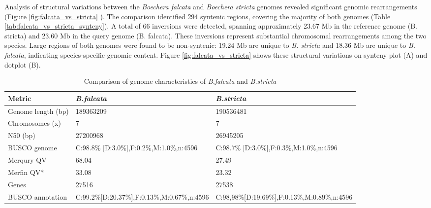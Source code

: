 \documentclass[9pt,twocolumn,twoside,lineno]{gsag3jnl}
\begin{document}
Analysis of structural variations between the \textit{Boechera falcata} and \textit{Boechera stricta} genomes revealed significant genomic rearrangements (Figure \ref{fig:falcata_vs_stricta} ). The comparison identified 294 syntenic regions, covering the majority of both genomes (Table \ref{tab:falcata_vs_stricta_synteny}). A total of 66 inversions were detected, spanning approximately 23.67 Mb in the reference genome (B. stricta) and 23.60 Mb in the query genome (B. falcata). These inversions represent substantial chromosomal rearrangements among the two species. Large regions of both genomes were found to be non-syntenic: 19.24 Mb are unique to \textit{B. stricta} and 18.36 Mb are unique to \textit{B. falcata}, indicating species-specific genomic content. Figure \ref{fig:falcata_vs_stricta} shows these structural variations on synteny plot (A) and dotplot (B).


\begin{table}[p]
\centering
\caption{Comparison of genome characteristics of \textit{B.falcata} and \textit{B.stricta}} 
\begin{tableminipage}{\textwidth}
\begin{tabularx}{\textwidth}{@{}XXX@{}}
\hline
\textbf{Metric}    & \textit{\textbf{B.falcata}}                                    & \textit{\textbf{B.stricta} }                                    \\
\hline
Genome length (bp) & 189363209                                                      & 190536481                                                      \\
Chromosomes (x)    & 7                                                              & 7                                                              \\
N50 (bp)           & 27200968                                                       & 26945205                                                       \\
BUSCO genome       & C:98.8\% [D:3.0\%],F:0.2\%,M:1.0\%,n:4596          & C:98.7\% [D:3.0\%],F:0.3\%,M:1.0\%,n:4596          \\
Merqury QV         & 68.04                                   & 27.49                                                          \\
Merfin QV*         & 33.08                                                          & 23.32                                                          \\
Genes              & 27516                                                          & 27538                                                          \\
BUSCO annotation   & C:99.2\%[D:20.37\%],F:0.13\%,M:0.67\%,n:4596 & C:98,98\%[D:19.69\%],F:0.13\%,M:0.89\%,n:4596 \\
\hline
\end{tabularx}
\label{tab:falcata_vs_stricta} 
\end{tableminipage}
\end{table}
\end{document}
